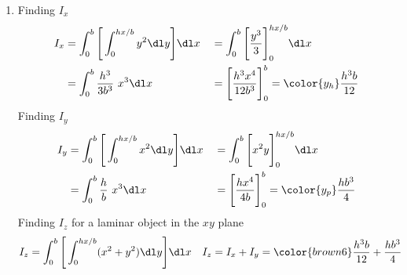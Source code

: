 \begin{enumerate}
    \item Finding $ I_x $
          \begin{align}
              I_x & = \int_{0}^{b} \Bigg[\int_{0}^{hx/b} y^2 \dl y\Bigg] \dl x &
                  & = \int_{0}^{b} \Bigg[ \frac{y^3}{3} \Bigg]_0^{hx/b} \dl x    \\
                  & = \int_{0}^{b} \frac{h^3}{3b^3}\ x^3 \dl x                 &
                  & = \Bigg[ \frac{h^3 x^4}{12b^3} \Bigg]_0^b
              = \color{y_h} \frac{h^3b}{12}
          \end{align}
          Finding $ I_y $
          \begin{align}
              I_y & = \int_{0}^{b} \Bigg[\int_{0}^{hx/b} x^2 \dl y\Bigg] \dl x &
                  & = \int_{0}^{b} \Bigg[ x^2y \Bigg]_0^{hx/b} \dl x             \\
                  & = \int_{0}^{b} \frac{h}{b}\ x^3 \dl x                      &
                  & = \Bigg[ \frac{hx^4}{4b} \Bigg]_0^b
              = \color{y_p} \frac{hb^3}{4}
          \end{align}
          Finding $ I_z $ for a laminar object in the $ xy $ plane
          \begin{align}
              I_z   & = \int_{0}^{b} \Bigg[\int_{0}^{hx/b} (x^2 + y^2) \dl y\Bigg]
              \dl x &
              I_z   & = I_x + I_y
              = \color{brown6} \frac{h^3b}{12} + \frac{hb^3}{4}
          \end{align}


\end{enumerate}
